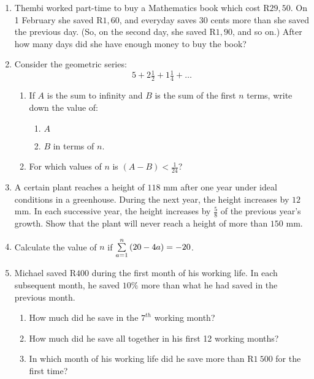 \begin{enumerate}
\item Thembi worked part-time to buy a Mathematics book which cost R$29,50$. On 1 February she saved R$1,60$, and everyday saves $30$ cents more than she saved the previous day. (So, on the second day, she saved R$1,90$, and so on.) After how many days did she have enough money to buy the book?

\item Consider the geometric series: $$5 + 2\tfrac{1}{2} + 1\tfrac{1}{4} + \ldots $$
\begin{enumerate}
\item If $A$ is the sum to infinity and $B$ is the sum of the first $n$ terms, write down the value of:
\begin{enumerate}
\item $A$
\item $B$ in terms of $n$.
\end{enumerate}

\item For which values of $n$ is $(A - B) < \tfrac{1}{24}$?
\end{enumerate}

\item A certain plant reaches a height of $118$ mm after one year under ideal conditions in a greenhouse. During the next year, the height increases by $12$ mm. In each successive year, the height increases by $\tfrac{5}{8}$ of the previous year's growth. Show that the plant will never reach a height of more than $150$ mm.

\item Calculate the value of $n$ if $\sum_{a=1}^n \limits \, (20 - 4a) = -20$.

\item Michael saved R$400$ during the first month of his working life. In each subsequent month, he saved $10\%$ more than what he had saved in the previous month.
\begin{enumerate}
\item How much did he save in the $7^{th}$ working month?
\item How much did he save all together in his first 12 working months?
\item In which month of his working life did he save more than R$1~500$ for the first time?
\end{enumerate}


\end{enumerate}
